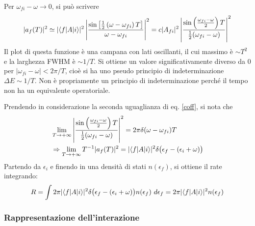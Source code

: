 \documentclass[11pt, a4paper]{scrartcl} %
\numberwithin{equation}{subsection}
\theoremstyle{style2}
\theoremstyle{style1}
\begin{document}
Per $\omega_{fi} -\omega \to 0 $, si pu\`o scrivere
\begin{equation}\label{coff}
\lvert a_f(T) \rvert ^2 \simeq \lvert \braket{f|A|i}  \rvert ^2 \left\lvert \frac{\sin \left[ \frac{1}{2}\left(\omega-\omega_{fi} \right) T \right] }{\omega-\omega_{fi} } \right\rvert ^2= c \lvert A_{fi}  \rvert ^2 \left\lvert \frac{\sin \left(\frac{\omega_{fi} -\omega}{2}\right) T}{\frac{1}{2}(\omega_{fi} -\omega)} \right\rvert ^2
\end{equation}
Il plot di questa funzione \`e una campana con lati oscillanti, il cui massimo \`e $\sim T^2$ e la larghezza FWHM \`e $\sim 1 / T$.
Si ottiene un valore significativamente diverso da $0$ per $\lvert \omega_{fi} -\omega \rvert < 2\pi / T$, cio\`e si ha uno pseudo principio di indeterminazione $\Delta E \sim 1 / T$.
Non \`e propriamente un principio di indeterminazione perch\'e il tempo non ha un equivalente operatoriale.

Prendendo in considerazione la seconda uguaglianza di eq. \ref{coff}, si nota che
\[
	\begin{split}
		&\lim_{T \to +\infty} \left\lvert \frac{\sin \left(\frac{\omega_{fi} -\omega}{2}\right) T}{\frac{1}{2}(\omega_{fi} -\omega)} \right\rvert ^2 =  2\pi \delta (\omega-\omega_{fi} ) T\\
		&\Rightarrow \lim_{T \to +\infty} T^{-1} \lvert a_f(T) \rvert ^2 = \lvert \braket{f|A|i}  \rvert ^2 \delta \big(\epsilon _f- (\epsilon _i +\omega)\big)
	\end{split}
\] 
Partendo da $\epsilon _i$ e finendo in una densit\`a di stati $n(\epsilon _f)$, si ottiene il rate integrando:
\begin{equation}
	R = \int 2\pi \lvert \braket{f|A|i}  \rvert ^2 \delta \big(\epsilon _f - (\epsilon _i + \omega)	\big) n(\epsilon _f) \ d\epsilon _f = 2\pi \lvert \braket{f|A|i}  \rvert ^2 n(\epsilon _f)
\end{equation}
\subsubsection{Rappresentazione dell'interazione}
\end{document}

